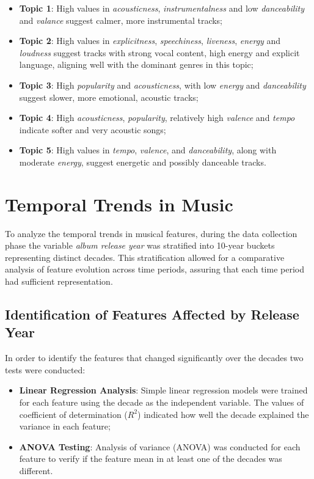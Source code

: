 \begin{itemize}
  \item \textbf{Topic 1}: High values in \textit{acousticness},
    \textit{instrumentalness} and low \textit{danceability} and
    \textit{valance} suggest calmer, more instrumental tracks;
  \item \textbf{Topic 2}: High values in \textit{explicitness},
    \textit{speechiness}, \textit{liveness}, \textit{energy} and
    \textit{loudness} suggest tracks with strong vocal content, high energy
    and explicit language, aligning well with the dominant genres in this
    topic;
  \item \textbf{Topic 3}: High \textit{popularity} and \textit{acousticness},
    with low \textit{energy} and  \textit{danceability} suggest slower,
    more emotional, acoustic tracks;
  \item \textbf{Topic 4}: High \textit{acousticness},  \textit{popularity},
    relatively high \textit{valence} and \textit{tempo} indicate softer and
    very acoustic songs;
  \item \textbf{Topic 5}: High values in \textit{tempo}, \textit{valence}, and
    \textit{danceability}, along with moderate \textit{energy}, suggest
    energetic and possibly danceable tracks.
\end{itemize}


\section{Temporal Trends in Music}
\label{sec:temporaltrends}

To analyze the temporal trends in musical features, during the data collection
phase the variable \textit{album release year} was stratified into 10-year
buckets representing distinct decades. This stratification allowed for a
comparative analysis of feature evolution across time periods, assuring
that each time period had sufficient representation.


\subsection{Identification of Features Affected by Release Year}

In order to identify the features that changed significantly over the decades
two tests were conducted:


\begin{itemize}
  \item \textbf{Linear Regression Analysis}: Simple linear regression models
    were trained for each feature using the decade as the independent variable.
    The values of coefficient of determination ($R^2$) indicated how well the
    decade explained the variance in each feature;
  \item \textbf{ANOVA Testing}: Analysis of variance (ANOVA) was conducted for
    each feature to verify if the feature mean in at least one of the decades
    was different.
\end{itemize}

